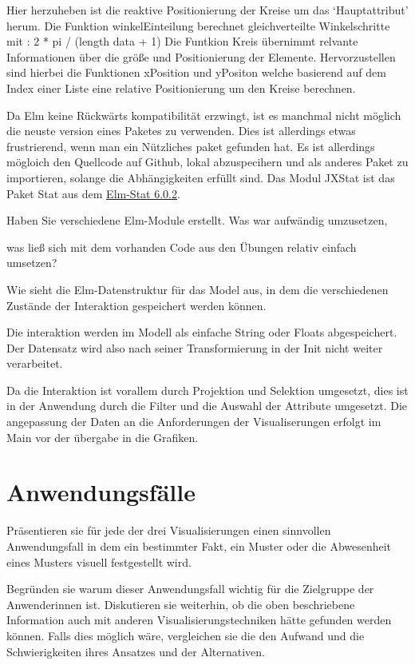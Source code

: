\documentclass[usegeometry=true]{scrartcl}
\begin{document}
Hier herzuheben ist die reaktive Positionierung der Kreise um das `Hauptattribut' herum.
Die Funktion winkelEinteilung berechnet gleichverteilte Winkelschritte mit : 2 * pi / (length data + 1) 
Die Funtkion Kreis übernimmt relvante Informationen über die größe und Positionierung der Elemente. 
Hervorzustellen sind hierbei die Funktionen xPosition und yPositon welche basierend auf dem Index einer Liste eine relative Positionierung um den Kreise berechnen. 



Da Elm keine Rückwärts kompatibilität erzwingt, ist es manchmal nicht möglich die neuste version eines Paketes zu verwenden. 
Dies ist allerdings etwas frustrierend, wenn man ein Nützliches paket gefunden hat. Es ist allerdings mögloich den Quellcode auf 
Github, lokal abzuspecihern und als anderes Paket zu importieren, solange die Abhängigkeiten erfüllt sind. Das Modul JXStat ist das Paket Stat aus dem \href{https://github.com/jxxcarlson/elm-stat/blob/6.0.2/src/Stat.elm}{Elm-Stat 6.0.2}. 

 Haben Sie verschiedene Elm-Module erstellt. Was war aufwändig umzusetzen, 

 was ließ sich mit dem vorhanden Code aus den Übungen relativ einfach umsetzen? 

Wie sieht die Elm-Datenstruktur für das Model aus, in dem die verschiedenen Zustände der Interaktion gespeichert werden können.

Die interaktion werden im Modell als einfache String oder Floats abgespeichert. Der Datensatz wird also nach seiner Transformierung in der Init  nicht weiter verarbeitet.

Da die Interaktion ist vorallem durch Projektion und Selektion umgesetzt, dies ist in der Anwendung durch die Filter und die Auswahl der Attribute umgesetzt.
Die angepassung der Daten an die Anforderungen der Visualiserungen erfolgt im Main vor der übergabe in die Grafiken. 



\section{Anwendungsfälle}
Präsentieren sie für jede der drei Visualisierungen einen sinnvollen Anwendungsfall 
in dem ein bestimmter Fakt, ein Muster oder die Abwesenheit eines Musters visuell festgestellt wird.


Begründen sie warum dieser Anwendungsfall wichtig für die Zielgruppe der Anwenderinnen ist.
Diskutieren sie weiterhin, ob die oben beschriebene Information auch mit anderen 
Visualisierungstechniken hätte gefunden werden können.
Falls dies möglich wäre, vergleichen sie die den Aufwand und die Schwierigkeiten ihres Ansatzes und der Alternativen. 
\end{document}
